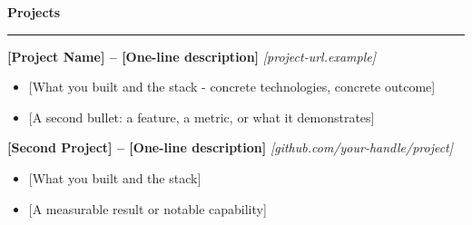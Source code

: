 \documentclass[10pt, letterpaper]{article}
\newcommand{\resumesection}[1]{
    \vspace{6pt}
    {\large\textbf{#1}}\\
    \vspace{3pt}
    \hrule
    \vspace{6pt}
}
\newcommand{\projectentry}[2]{
    \textbf{#1} \newline #2
    \vspace{2pt}
}
\newenvironment{resumelist}{
    \begin{itemize}[leftmargin=15pt, topsep=0pt, itemsep=2pt, parsep=0pt]
}{
    \end{itemize}
    \vspace{4pt}
}
\begin{document}
\resumesection{Projects}

\projectentry{[Project Name] -- [One-line description]}{\textit{[project-url.example]}}
\begin{resumelist}
\item {[What you built and the stack - concrete technologies, concrete outcome]}
\item {[A second bullet: a feature, a metric, or what it demonstrates]}
\end{resumelist}

\projectentry{[Second Project] -- [One-line description]}{\textit{[github.com/your-handle/project]}}
\begin{resumelist}
\item {[What you built and the stack]}
\item {[A measurable result or notable capability]}
\end{resumelist}
\end{document}
